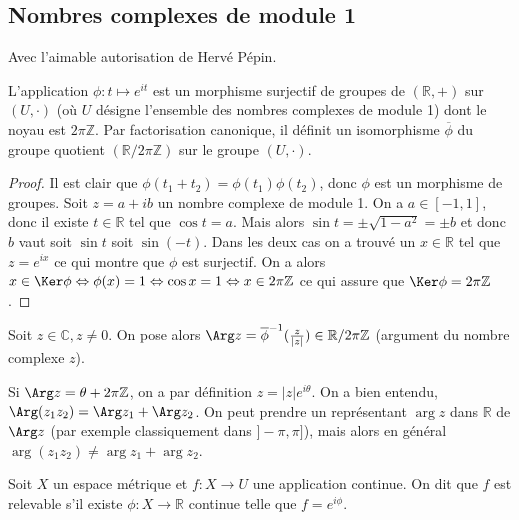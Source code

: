 \subsection{Nombres complexes de module 1}

Avec l'aimable autorisation de Hervé Pépin.

\begin{thm}
L'application $\phi : t \mapsto e^{it}$ est un morphisme surjectif de groupes de $(\mathbb{R},+)$ sur $(U,\cdot)$ (où $U$ désigne l'ensemble des nombres complexes de module 1) dont le noyau est $2\pi\mathbb{Z}$. Par factorisation canonique, il définit un isomorphisme $\overline{\phi}$ du groupe quotient $(\mathbb{R}/2\pi\mathbb{Z})$ sur le groupe $(U,\cdot)$.
\end{thm}

\begin{proof}
Il est clair que $\phi(t_1 + t_2) = \phi(t_1)\phi(t_2)$, donc $\phi$ est un morphisme de groupes. Soit $z = a + ib$ un nombre complexe de module 1. On a $a \in [-1,1]$, donc il existe $t \in \mathbb{R}$ tel que $\cos t = a$. Mais alors $\sin t = \pm \sqrt{1 - a^2} = \pm b$ et donc $b$ vaut soit $\sin t$ soit $\sin(-t)$. Dans les deux cas on a trouvé un $x \in \mathbb{R}$ tel que $z = e^{ix}$ ce qui montre que $\phi$ est surjectif. On a alors $x \in \Ker \phi \Leftrightarrow \phi(x) = 1 \Leftrightarrow \cos x = 1 \Leftrightarrow x \in 2\pi\mathbb{Z}$ ce qui assure que $\Ker \phi = 2\pi\mathbb{Z}$.
\end{proof}

\begin{de}
Soit $z \in \mathbb{C}, z \neq 0$. On pose alors $\Arg z = \overline{\phi}^{-1}(\frac{z}{|z|}) \in \mathbb{R}/2\pi\mathbb{Z}$ (argument du nombre complexe $z$).
\end{de}

\begin{rem}
Si $\Arg z = \theta + 2\pi\mathbb{Z}$, on a par définition $z = |z|e^{i\theta}$. On a bien entendu, $\Arg(z_1 z_2) = \Arg z_1 + \Arg z_2$. On peut prendre un représentant $\arg z$ dans $\mathbb{R}$ de $\Arg z$ (par exemple classiquement dans $]-\pi,\pi]$), mais alors en général $\arg(z_1 z_2) \neq \arg z_1 + \arg z_2$.
\end{rem}

\begin{de}
Soit $X$ un espace métrique et $f : X \rightarrow U$ une application continue. On dit que $f$ est relevable s'il existe $\phi : X \rightarrow \mathbb{R}$ continue telle que $f = e^{i\phi}$.
\end{de}

